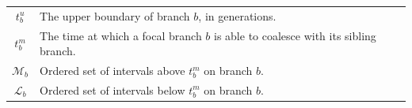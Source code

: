 \documentclass[11pt]{article}
\begin{document}
\begin{table}[p]
\begin{tabular}[t]{ |c|l| }
	$t_b^u$        & The upper boundary of branch $b$, in generations. \\
	$t_b^m$        & The time at which a focal branch $b$ is able to coalesce with its sibling branch. \\
	$\mathcal{M}_b$  & Ordered set of intervals above $t_b^m$ on branch $b$.\\
	$\mathcal{L}_b$  & Ordered set of intervals below $t_b^m$ on branch $b$.\\	
	\bottomrule
\end{tabular}
\end{table}



\newpage





\end{document}
